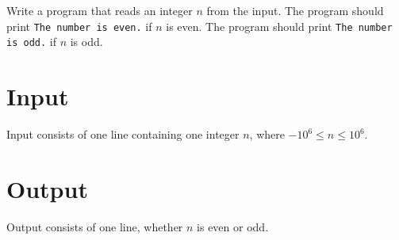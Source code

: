 
Write a program that reads an integer $n$ from the input.
The program should print \texttt{The number is even.} if $n$ is even.
The program should print \texttt{The number is odd.} if $n$ is odd.

\section*{Input}
Input consists of one line containing one integer $n$, where $-10^6 \leq n \leq 10^6$.

\section*{Output}
Output consists of one line, whether $n$ is even or odd.
